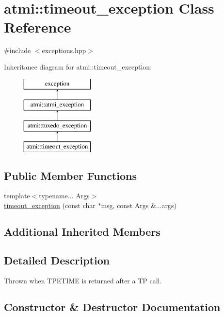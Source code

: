 \hypertarget{classatmi_1_1timeout__exception}{}\section{atmi\+:\+:timeout\+\_\+exception Class Reference}
\label{classatmi_1_1timeout__exception}


{\ttfamily \#include $<$exceptions.\+hpp$>$}

Inheritance diagram for atmi\+:\+:timeout\+\_\+exception\+:\begin{figure}[H]
\begin{center}
\leavevmode
\includegraphics[height=4.000000cm]{classatmi_1_1timeout__exception}
\end{center}
\end{figure}
\subsection*{Public Member Functions}
\begin{DoxyCompactItemize}
\item 
{\footnotesize template$<$typename... Args$>$ }\\\hyperlink{classatmi_1_1timeout__exception_a8fe65e08189bb4d6cbcd63bbfdb53a2b}{timeout\+\_\+exception} (const char $\ast$msg, const Args \&...args)
\end{DoxyCompactItemize}
\subsection*{Additional Inherited Members}


\subsection{Detailed Description}
Thrown when T\+P\+E\+T\+I\+M\+E is returned after a T\+P call. 

\subsection{Constructor \& Destructor Documentation}
\hypertarget{classatmi_1_1timeout__exception_a8fe65e08189bb4d6cbcd63bbfdb53a2b}{}
